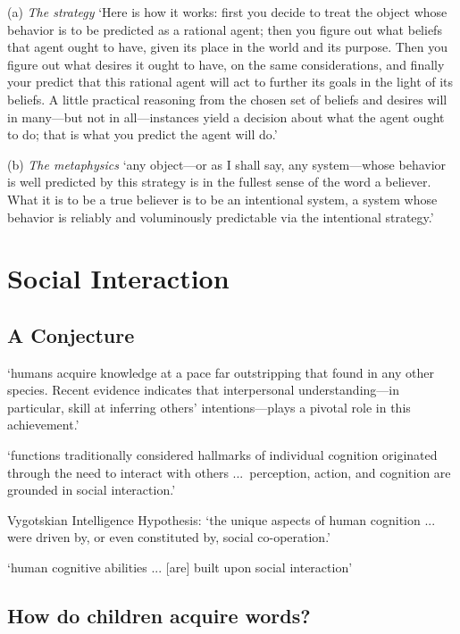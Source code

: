 \documentclass[12pt]{extarticle}
\begin{document}
\begin{multicols}{3}
(a) \textit{The strategy} ‘Here is how it works: first you decide to treat the object whose behavior is to be predicted as a rational agent; then you figure out what beliefs that agent ought to have, given its place in the world and its purpose. Then you figure out what desires it ought to have, on the same considerations, and finally your predict that this rational agent will act to further its goals in the light of its beliefs. A little practical reasoning from the chosen set of beliefs and desires will in many---but not in all---instances yield a decision about what the agent ought to do; that is what you predict the agent will do.’
\citep[p.\ 17]{Dennett:1987sf}
 
(b) \textit{The metaphysics} ‘any object---or as I shall say, any system---whose behavior is well predicted by this strategy is in the fullest sense of the word a believer. What it is to be a true believer is to be an intentional system, a system whose behavior is reliably and voluminously predictable via the intentional strategy.’
\citep[p.\ 15]{Dennett:1987sf}
 
 
 
\section{Social Interaction}
 
\subsection{A Conjecture}
 
‘humans acquire knowledge at a pace far outstripping that found in any other species. Recent evidence indicates that interpersonal understanding—in particular, skill at inferring others’ intentions—plays a pivotal role in this achievement.’
\citep[p.\ 40]{Baldwin:2000qq}
 
‘functions traditionally considered hallmarks of individual cognition originated through the need to interact with others ...\ perception, action, and cognition are grounded in social interaction.’
\citep[p.\ 103]{Knoblich:2006bn}
 
Vygotskian Intelligence Hypothesis:
‘the unique aspects of human cognition ... were driven by, or even constituted by, social co-operation.’
\citep[p.\ 1]{Moll:2007gu}
 
‘human cognitive abilities ... [are] built upon social interaction’
\citep{sinigaglia:2008_roots} %
 
\subsection{How do children acquire words?}
 

\end{multicols}
\end{document}
